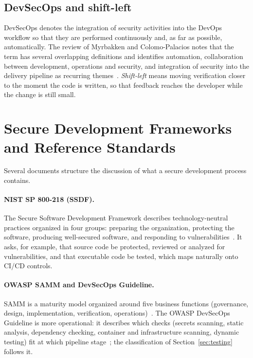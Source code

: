 \subsection{DevSecOps and shift-left}

DevSecOps denotes the integration of security activities into the DevOps workflow so that they are performed continuously and, as far as possible, automatically. The review of Myrbakken and Colomo-Palacios notes that the term has several overlapping definitions and identifies automation, collaboration between development, operations and security, and integration of security into the delivery pipeline as recurring themes~\cite{myrbakken2017}. \emph{Shift-left} means moving verification closer to the moment the code is written, so that feedback reaches the developer while the change is still small.

\section{Secure Development Frameworks and Reference Standards}
\label{sec:frameworks}

Several documents structure the discussion of what a secure development process contains.

\paragraph{NIST SP 800-218 (SSDF).} The Secure Software Development Framework describes technology-neutral practices organized in four groups: preparing the organization, protecting the software, producing well-secured software, and responding to vulnerabilities~\cite{nist-ssdf}. It asks, for example, that source code be protected, reviewed or analyzed for vulnerabilities, and that executable code be tested, which maps naturally onto CI/CD controls.

\paragraph{OWASP SAMM and DevSecOps Guideline.} SAMM is a maturity model organized around five business functions (governance, design, implementation, verification, operations)~\cite{owasp-samm}. The OWASP DevSecOps Guideline is more operational: it describes which checks (secrets scanning, static analysis, dependency checking, container and infrastructure scanning, dynamic testing) fit at which pipeline stage~\cite{owasp-devsecops}; the classification of Section~\ref{sec:testing} follows it.

